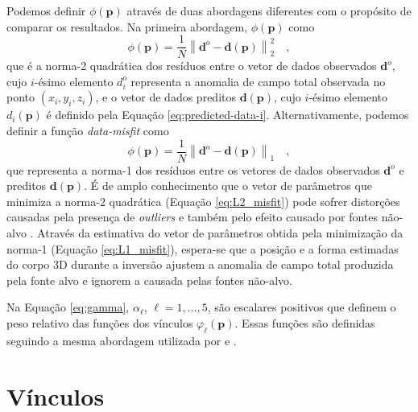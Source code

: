 Podemos definir $\phi (\mathbf{p})$ através de duas abordagens diferentes com o propósito de comparar os resultados. Na primeira abordagem, $\phi (\mathbf{p})$ como
\begin{equation}\label{eq:L2_misfit}
\phi (\mathbf{p}) = \frac{1}{N} 
\left\| \mathbf{d}^{o} - \mathbf{d}(\mathbf{p}) \right\|_{2}^{2} \quad ,
\end{equation}
que é a norma-2 quadrática \citep[por exemplo,][p. 331]{aster_etal2019} dos resíduos entre o vetor de dados observados $\mathbf{d}^{o}$, cujo $i$-ésimo elemento $d_{i}^{o}$ representa a anomalia de campo total observada no ponto $(x_{i}, y_{i}, z_{i})$, e o vetor de dados preditos $\mathbf{d}(\mathbf{p})$, cujo $i$-ésimo elemento $d_{i} (\mathbf{p})$ é definido pela Equação \ref{eq:predicted-data-i}.
Alternativamente, podemos definir a função \textit{data-misfit} como
\begin{equation}\label{eq:L1_misfit}
\phi (\mathbf{p}) = \frac{1}{N} 
\left\| \mathbf{d}^{o} - \mathbf{d}(\mathbf{p}) \right\|_{1} \quad ,
\end{equation}
que representa a norma-1 \citep[por exemplo,][p. 331]{aster_etal2019}
dos resíduos entre os vetores de dados observados $\mathbf{d}^{o}$ e preditos $\mathbf{d}(\mathbf{p})$.
É de amplo conhecimento que o vetor de parâmetros que minimiza a norma-2 quadrática (Equação \ref{eq:L2_misfit}) pode sofrer distorções causadas pela presença de \textit{outliers} e também pelo efeito causado por fontes não-alvo \cite[por exemplo,][]{claerbout_muir1973, 
	silva_hohmann1983, scales_gersztenkorn1988, silva_cutrim1989, farquharson_oldenburg1998, 
	uieda_barbosa2012, oliveirajr_etal2015, aster_etal2019}.
Através da estimativa do vetor de parâmetros obtida pela minimização da norma-1 (Equação \ref{eq:L1_misfit}), espera-se que a posição e a forma estimadas do corpo 3D durante a inversão ajustem a anomalia de campo total produzida pela fonte alvo e ignorem a causada pelas fontes não-alvo.

Na Equação \ref{eq:gamma}, $\alpha_{\ell}$, $\ell = 1, \dots, 5$, são escalares positivos que definem o peso relativo das funções dos vínculos $\varphi_{\ell}(\mathbf{p})$.
Essas funções são definidas seguindo a mesma abordagem utilizada por \citet{oliveirajr_etal2011} e \citet{oliveirajr_barbosa2013}.

\section{Vínculos}\label{sec:constraints}

